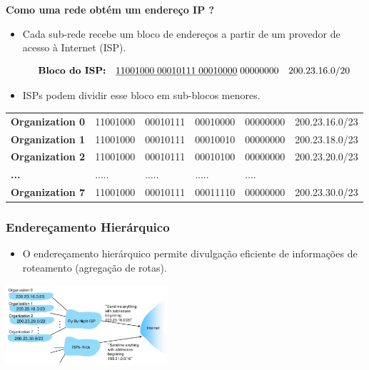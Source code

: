             \textbf{Como uma rede obtém um endereço IP ?}
            \begin{itemize}[left=0.5cm, align=left, nosep]
                \item Cada sub-rede recebe um bloco de endereços a partir de um provedor de acesso à Internet (ISP).
                
                \[
                    \textbf{Bloco do ISP:} \quad
                    \uline{11001000 \; 00010111 \; 00010000} \; 00000000
                    \quad 200.23.16.0/20
                \]
                
                \item ISPs podem dividir esse bloco em sub-blocos menores.
            \end{itemize}

            \begin{center}
                \begin{tabular}{l l l l l l}
                    \textbf{Organization 0} & 11001000 & 00010111 & 00010000 & 00000000 & 200.23.16.0/23 \\
                    \textbf{Organization 1} & 11001000 & 00010111 & 00010010 & 00000000 & 200.23.18.0/23 \\
                    \textbf{Organization 2} & 11001000 & 00010111 & 00010100 & 00000000 & 200.23.20.0/23 \\
                    \textbf{...}            & .....    & .....    & .....    & ....     & \\
                    \textbf{Organization 7} & 11001000 & 00010111 & 00011110 & 00000000 & 200.23.30.0/23 \\
                \end{tabular}
            \end{center}

            \subsubsection*{Endereçamento Hierárquico}
            \begin{itemize}[left=0.5cm, align=left, nosep]
                \item O endereçamento hierárquico permite divulgação eficiente de informações de roteamento (agregação de rotas).
            \end{itemize}

            \begin{center}
                \includegraphics[width=0.45\textwidth]{img/cap-04/hierarquia-de-endereco.png}
            \end{center}

